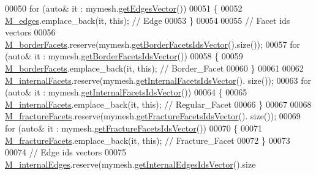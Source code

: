 \begin{DoxyCode}
00050     \textcolor{keywordflow}{for} (\textcolor{keyword}{auto}& it : mymesh.\hyperlink{classFVCode3D_1_1Rigid__Mesh_a807a6932cb5b80eb73bf86c3dae06a80}{getEdgesVector}())
00051     \{
00052         \hyperlink{classFVCode3D_1_1Rigid__Mesh_a4c6287c9256a92c13486048c372fe487}{M\_edges}.emplace\_back(it, \textcolor{keyword}{this}); \textcolor{comment}{// Edge}
00053     \}
00054 
00055     \textcolor{comment}{// Facet ids vectors}
00056     \hyperlink{classFVCode3D_1_1Rigid__Mesh_a21700f8c7b816da944a829ee9d3ab7fb}{M\_borderFacets}.reserve(mymesh.\hyperlink{classFVCode3D_1_1Rigid__Mesh_aa72b7fad937f0d1586fc10b176ef5d3e}{getBorderFacetsIdsVector}().size());
00057     \textcolor{keywordflow}{for} (\textcolor{keyword}{auto}& it : mymesh.\hyperlink{classFVCode3D_1_1Rigid__Mesh_aa72b7fad937f0d1586fc10b176ef5d3e}{getBorderFacetsIdsVector}())
00058     \{
00059         \hyperlink{classFVCode3D_1_1Rigid__Mesh_a21700f8c7b816da944a829ee9d3ab7fb}{M\_borderFacets}.emplace\_back(it, \textcolor{keyword}{this}); \textcolor{comment}{// Border\_Facet}
00060     \}
00061 
00062     \hyperlink{classFVCode3D_1_1Rigid__Mesh_a8ede7966973fec708327b95fc379a4e1}{M\_internalFacets}.reserve(mymesh.\hyperlink{classFVCode3D_1_1Rigid__Mesh_a838ebf69155c115c2646d1a20b0ad249}{getInternalFacetsIdsVector}().
      size());
00063     \textcolor{keywordflow}{for} (\textcolor{keyword}{auto}& it : mymesh.\hyperlink{classFVCode3D_1_1Rigid__Mesh_a838ebf69155c115c2646d1a20b0ad249}{getInternalFacetsIdsVector}())
00064     \{
00065         \hyperlink{classFVCode3D_1_1Rigid__Mesh_a8ede7966973fec708327b95fc379a4e1}{M\_internalFacets}.emplace\_back(it, \textcolor{keyword}{this}); \textcolor{comment}{// Regular\_Facet}
00066     \}
00067 
00068     \hyperlink{classFVCode3D_1_1Rigid__Mesh_acaff9da1f03f04f7012cf372f8f27cd6}{M\_fractureFacets}.reserve(mymesh.\hyperlink{classFVCode3D_1_1Rigid__Mesh_aadbe6d9ad704122537903396d91238e0}{getFractureFacetsIdsVector}().
      size());
00069     \textcolor{keywordflow}{for} (\textcolor{keyword}{auto}& it : mymesh.\hyperlink{classFVCode3D_1_1Rigid__Mesh_aadbe6d9ad704122537903396d91238e0}{getFractureFacetsIdsVector}())
00070     \{
00071         \hyperlink{classFVCode3D_1_1Rigid__Mesh_acaff9da1f03f04f7012cf372f8f27cd6}{M\_fractureFacets}.emplace\_back(it, \textcolor{keyword}{this}); \textcolor{comment}{// Fracture\_Facet}
00072     \}
00073 
00074     \textcolor{comment}{// Edge ids vectors}
00075     \hyperlink{classFVCode3D_1_1Rigid__Mesh_a3b689233b2590d76d663195b89d380fb}{M\_internalEdges}.reserve(mymesh.\hyperlink{classFVCode3D_1_1Rigid__Mesh_aa6978e883bc7ef09478a0c85c25fabb2}{getInternalEdgesIdsVector}().size

\end{DoxyCode}

